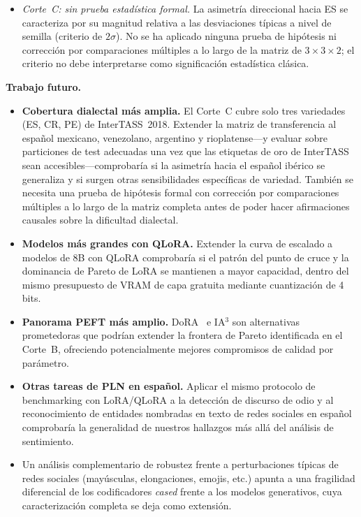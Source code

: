\documentclass[conference]{IEEEtran}
\begin{document}
\begin{itemize}
  \item \emph{Corte~C: sin prueba estadística formal.}
    La asimetría direccional hacia ES se caracteriza por su magnitud relativa a
    las desviaciones típicas a nivel de semilla (criterio de $2\sigma$).
    No se ha aplicado ninguna prueba de hipótesis ni corrección por comparaciones
    múltiples a lo largo de la matriz de $3\times3\times2$; el criterio no debe
    interpretarse como significación estadística clásica.
\end{itemize}

\textbf{Trabajo futuro.}

\begin{itemize}
  \item \textbf{Cobertura dialectal más amplia.}
    El Corte~C cubre solo tres variedades (ES, CR, PE) de InterTASS~2018.
    Extender la matriz de transferencia al español mexicano, venezolano,
    argentino y rioplatense---y evaluar sobre particiones de test adecuadas una
    vez que las etiquetas de oro de InterTASS sean accesibles---comprobaría si la
    asimetría hacia el español ibérico se generaliza y si surgen otras
    sensibilidades específicas de variedad.
    También se necesita una prueba de hipótesis formal con corrección por
    comparaciones múltiples a lo largo de la matriz completa antes de poder hacer
    afirmaciones causales sobre la dificultad dialectal.

  \item \textbf{Modelos más grandes con QLoRA.} Extender la curva de escalado a
    modelos de 8B con QLoRA comprobaría si el patrón del punto de cruce y la
    dominancia de Pareto de LoRA se mantienen a mayor capacidad, dentro del mismo
    presupuesto de VRAM de capa gratuita mediante cuantización de 4 bits.

  \item \textbf{Panorama PEFT más amplio.} DoRA~\cite{liu2022dora} e IA$^3$
    son alternativas prometedoras que podrían extender la frontera de Pareto
    identificada en el Corte~B, ofreciendo potencialmente mejores compromisos de
    calidad por parámetro.

  \item \textbf{Otras tareas de PLN en español.} Aplicar el mismo protocolo de
    benchmarking con LoRA/QLoRA a la detección de discurso de odio y al
    reconocimiento de entidades nombradas en texto de redes sociales en español
    comprobaría la generalidad de nuestros hallazgos más allá del análisis de
    sentimiento.

  \item Un análisis complementario de robustez frente a perturbaciones típicas
    de redes sociales (mayúsculas, elongaciones, emojis, etc.) apunta a una
    fragilidad diferencial de los codificadores \textit{cased} frente a los
    modelos generativos, cuya caracterización completa se deja como extensión.

\end{itemize}
\end{document}
